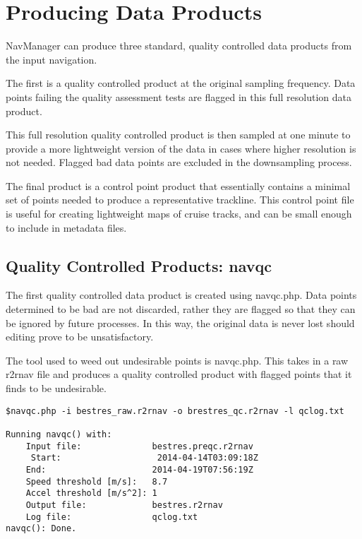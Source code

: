 \documentclass{article}
\begin{document}
	\newpage	
	\section{Producing Data Products}
	

NavManager can produce three standard, quality controlled data products from the input navigation.

The first is a quality controlled product at the original sampling frequency. Data points failing the quality assessment tests are flagged in this full resolution data product.

This full resolution quality controlled product is then sampled at one minute to provide a more lightweight version of the data in cases where higher resolution is not needed.  Flagged bad data points are excluded in the downsampling process.

The final product is a control point product that essentially contains a minimal set of points needed to produce a representative trackline.  This control point file is useful for creating lightweight maps of cruise tracks, and can be small enough to include in metadata files.

		\subsection{Quality Controlled Products: navqc}
		\label{navqc}
			
The first quality controlled data product is created using navqc.php.  Data points determined to be bad are not discarded, rather they are flagged so that they can be ignored by future processes.  In this way, the original data is never lost should editing prove to be unsatisfactory.

The tool used to weed out undesirable points is navqc.php.  This takes in a raw r2rnav file and produces a quality controlled product with flagged points that it finds to be undesirable.

		\begin{lstlisting}
$navqc.php -i bestres_raw.r2rnav -o brestres_qc.r2rnav -l qclog.txt

Running navqc() with:
	Input file:              bestres.preqc.r2rnav
	 Start:                   2014-04-14T03:09:18Z
	End:                     2014-04-19T07:56:19Z
	Speed threshold [m/s]:   8.7
	Accel threshold [m/s^2]: 1
	Output file:             bestres.r2rnav
	Log file:                qclog.txt
navqc(): Done.
    
		\end{lstlisting}
		
\end{document}
